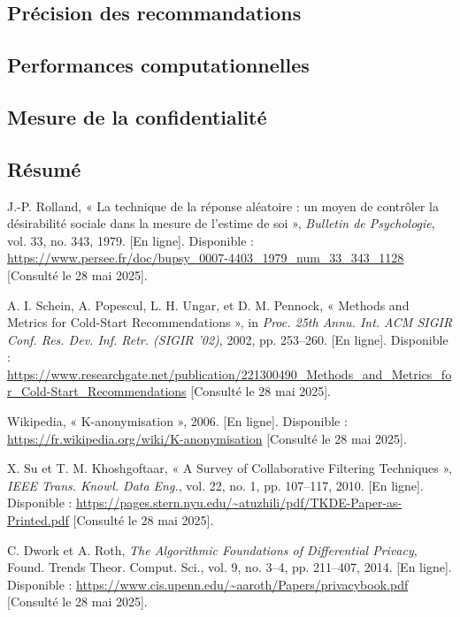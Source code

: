 \documentclass{article}
\begin{document}
    \subsection{Précision des recommandations}
    \subsection{Performances computationnelles}
    \subsection{Mesure de la confidentialité}
    \subsection{Résumé}


\begin{thebibliography}{99}

J.-P. Rolland, « La technique de la réponse aléatoire : un moyen de contrôler la désirabilité sociale dans la mesure de l'estime de soi », \emph{Bulletin de Psychologie}, vol. 33, no. 343, 1979. [En ligne]. Disponible : \url{https://www.persee.fr/doc/bupsy_0007-4403_1979_num_33_343_1128} [Consulté le 28 mai 2025].

A. I. Schein, A. Popescul, L. H. Ungar, et D. M. Pennock, « Methods and Metrics for Cold-Start Recommendations », in \emph{Proc. 25th Annu. Int. ACM SIGIR Conf. Res. Dev. Inf. Retr. (SIGIR '02)}, 2002, pp. 253–260. [En ligne]. Disponible : \url{https://www.researchgate.net/publication/221300490_Methods_and_Metrics_for_Cold-Start_Recommendations} [Consulté le 28 mai 2025].

Wikipedia, « K-anonymisation », 2006. [En ligne]. Disponible : \url{https://fr.wikipedia.org/wiki/K-anonymisation} [Consulté le 28 mai 2025].

X. Su et T. M. Khoshgoftaar, « A Survey of Collaborative Filtering Techniques », \emph{IEEE Trans. Knowl. Data Eng.}, vol. 22, no. 1, pp. 107–117, 2010. [En ligne]. Disponible : \url{https://pages.stern.nyu.edu/~atuzhili/pdf/TKDE-Paper-as-Printed.pdf} [Consulté le 28 mai 2025].

C. Dwork et A. Roth, \emph{The Algorithmic Foundations of Differential Privacy}, Found. Trends Theor. Comput. Sci., vol. 9, no. 3–4, pp. 211–407, 2014. [En ligne]. Disponible : \url{https://www.cis.upenn.edu/~aaroth/Papers/privacybook.pdf} [Consulté le 28 mai 2025].


\end{thebibliography}
\end{document}
